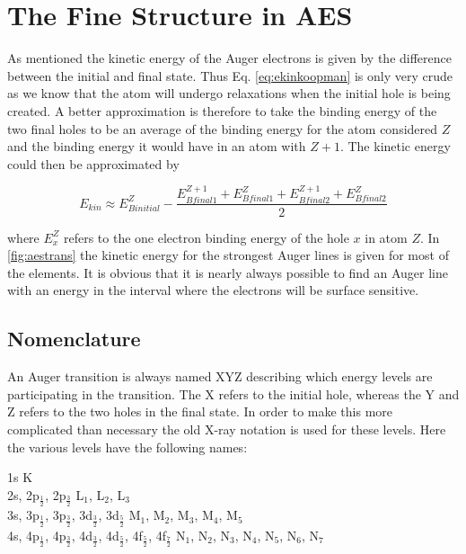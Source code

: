 \section{The Fine Structure in AES}
As mentioned the kinetic energy of the Auger electrons is given by the difference between the initial and final state. Thus Eq. \eqref{eq:ekinkoopman} is only very crude as we know that the atom will undergo relaxations when the initial  hole is being created. A better approximation is therefore to take the binding energy of the two final holes to be an average of the binding energy for the atom considered $Z$ and the binding energy it would have in an atom with $Z+1$. The kinetic energy could then be approximated by

\begin{equation}
E_{kin}\approx E_{Binitial}^Z-\frac{E_{Bfinal1}^{Z+1}+E_{Bfinal1}^Z+E_{Bfinal2}^{Z+1}+E_{Bfinal2}^Z}{2}
\end{equation}

\noindent where $E_x^Z$ refers to the one electron binding energy of the hole $x$ in atom $Z$. In \autoref{fig:aestrans} the kinetic energy for the strongest Auger lines is given for most of the elements. It is obvious that it is nearly always possible to find an Auger line with an energy in the interval where the electrons will be surface sensitive.

\subsection{Nomenclature}
An Auger transition is always named XYZ describing which energy levels are participating in the transition. The X refers to the initial hole, whereas the Y and Z refers to the two holes in the final state. In order to make this more complicated than necessary the old X-ray  notation is used for these levels. Here the various levels have the following names:

\vspace{0.5cm}

             \noindent   1s   \hfill   K\\   2s,   2p$_{\frac{1}{2}}$,
          2p$_{\frac{3}{2}}$ \hfill L$_1$,  L$_2$,  L$_3$\\  3s,
          3p$_{\frac{1}{2}}$, 3p$_{\frac{3}{2}}$,  3d$_{\frac{3}{2}}$,
          3d$_{\frac{5}{2}}$   \hfill   M$_1$,   M$_2$,   M$_3$,
          M$_4$,       M$_5$\\       4s,       4p$_{\frac{1}{2}}$,
          4p$_{\frac{3}{2}}$, 4d$_{\frac{3}{2}}$,  4d$_{\frac{5}{2}}$,
          4f$_{\frac{5}{2}}$,   4f$_{\frac{7}{2}}$   \hfill   N$_1$,
          N$_2$,  N$_3$,  N$_4$,  N$_5$,  N$_6$,   N$_7$\\
          
